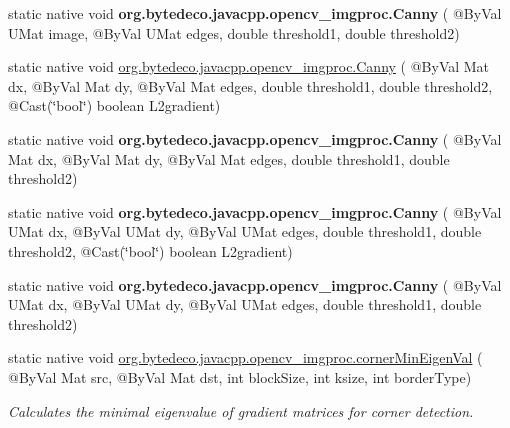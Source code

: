 \begin{DoxyCompactItemize}
\item 
\mbox{\label{group__imgproc__feature_gae66224d795c6ccea52a286dfc0697003}} 
static native void {\bfseries org.\+bytedeco.\+javacpp.\+opencv\+\_\+imgproc.\+Canny} ( @By\+Val U\+Mat image, @By\+Val U\+Mat edges, double threshold1, double threshold2)
\item 
static native void \hyperlink{group__imgproc__feature_ga64af31e287f8de7a4fd3ee87c522add9}{org.\+bytedeco.\+javacpp.\+opencv\+\_\+imgproc.\+Canny} ( @By\+Val Mat dx, @By\+Val Mat dy, @By\+Val Mat edges, double threshold1, double threshold2, @Cast(\char`\"{}bool\char`\"{}) boolean L2gradient)
\item 
\mbox{\label{group__imgproc__feature_ga16f0dfc24199cf24e69fdf76cc3a3b97}} 
static native void {\bfseries org.\+bytedeco.\+javacpp.\+opencv\+\_\+imgproc.\+Canny} ( @By\+Val Mat dx, @By\+Val Mat dy, @By\+Val Mat edges, double threshold1, double threshold2)
\item 
\mbox{\label{group__imgproc__feature_gac2c44d4cb3ef966505b14da6c37ac6e1}} 
static native void {\bfseries org.\+bytedeco.\+javacpp.\+opencv\+\_\+imgproc.\+Canny} ( @By\+Val U\+Mat dx, @By\+Val U\+Mat dy, @By\+Val U\+Mat edges, double threshold1, double threshold2, @Cast(\char`\"{}bool\char`\"{}) boolean L2gradient)
\item 
\mbox{\label{group__imgproc__feature_ga7b620e9806b07bf5264eec9b3bce0a28}} 
static native void {\bfseries org.\+bytedeco.\+javacpp.\+opencv\+\_\+imgproc.\+Canny} ( @By\+Val U\+Mat dx, @By\+Val U\+Mat dy, @By\+Val U\+Mat edges, double threshold1, double threshold2)
\item 
static native void \hyperlink{group__imgproc__feature_gac03777715e9e2aa616d310aa504b86c1}{org.\+bytedeco.\+javacpp.\+opencv\+\_\+imgproc.\+corner\+Min\+Eigen\+Val} ( @By\+Val Mat src, @By\+Val Mat dst, int block\+Size, int ksize, int border\+Type)
\begin{DoxyCompactList}\small\item\em Calculates the minimal eigenvalue of gradient matrices for corner detection. \end{DoxyCompactList}\item 
\mbox{\label{group__imgproc__feature_ga19cb37c0bd38334d96f002fd261ac70d}} 

\end{DoxyCompactItemize}
